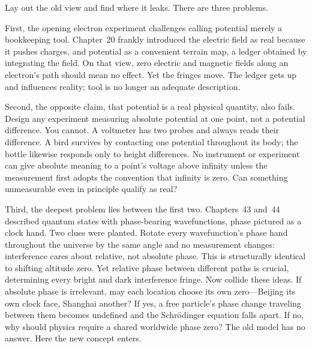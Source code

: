 \begin{mainline}
Lay out the old view and find where it leaks. There are three problems.

First, the opening electron experiment challenges calling potential merely a bookkeeping tool. Chapter~20 frankly introduced the electric field as real because it pushes charges, and potential as a convenient terrain map, a ledger obtained by integrating the field. On that view, zero electric and magnetic fields along an electron's path should mean no effect. Yet the fringes move. The ledger gets up and influences reality; tool is no longer an adequate description.

Second, the opposite claim, that potential is a real physical quantity, also fails. Design any experiment measuring absolute potential at one point, not a potential difference. You cannot. A voltmeter has two probes and always reads their difference. A bird survives by contacting one potential throughout its body; the bottle likewise responds only to height differences. No instrument or experiment can give absolute meaning to a point's voltage above infinity unless the measurement first adopts the convention that infinity is zero. Can something unmeasurable even in principle qualify as real?

Third, the deepest problem lies between the first two. Chapters~43 and~44 described quantum states with phase-bearing wavefunctions, phase pictured as a clock hand. Two clues were planted. Rotate every wavefunction's phase hand throughout the universe by the same angle and no measurement changes: interference cares about relative, not absolute phase. This is structurally identical to shifting altitude zero. Yet relative phase between different paths is crucial, determining every bright and dark interference fringe. Now collide these ideas. If absolute phase is irrelevant, may each location choose its own zero---Beijing its own clock face, Shanghai another? If yes, a free particle's phase change traveling between them becomes undefined and the Schr\"odinger equation falls apart. If no, why should physics require a shared worldwide phase zero? The old model has no answer. Here the new concept enters.
\end{mainline}


